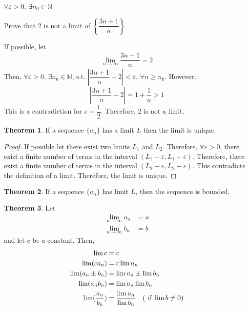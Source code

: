\documentclass[fleqn, a4paper, 12pt, twoside]{article}
\theoremstyle{definition}
\theoremstyle{theorem}
\newtheorem{theorem}{Theorem}
\begin{document}
{\begin{solution}
	$\forall \varepsilon > 0$, $\exists n_0 \in \mathbb{N}$
\end{solution}

\begin{question}
	Prove that 2 is not a limit of $\left\{ \dfrac{3n + 1}{n} \right\}$.
\end{question}

\begin{solution}
	If possible, let 
	\begin{align*}
		\lim\limits_{n \to \infty} \dfrac{3n + 1}{n} = 2
	\end{align*}
	Then, $\forall \varepsilon > 0$, $\exists n_0 \in \mathbb{N}$, s.t. $\left| \dfrac{3n + 1}{n} - 2 \right| < \varepsilon$, $\forall n \geq n_0$.
	However,
	\begin{equation*}
		\left| \dfrac{3n + 1}{n} - 2 \right| = 1 + \dfrac{1}{n} > 1
	\end{equation*}
	This is a contradiction for $\varepsilon = \dfrac{1}{2}$.
	Therefore, 2 is not a limit.
\end{solution}

\begin{theorem}
	If a sequence $\{a_n\}$ has a limit $L$ then the limit is unique.
	\label{uniquness of a limit}
\end{theorem}

\begin{proof}
	If possible let there exist two limits $L_1$ and $L_2$.
	Therefore, $\forall \varepsilon > 0$, there exist a finite number of terms in the interval $(L_1 - \varepsilon, L_1 + \varepsilon)$.
	Therefore, there exist a finite number of terms in the interval $(L_2 - \varepsilon, L_2 + \varepsilon)$.
	This contradicts the definition of a limit.
	Therefore, the limit is unique.
\end{proof}

\begin{theorem}
	If a sequence $\{a_n\}$ has limit $L$, then the sequence is bounded.
	\label{existence of limit implies boundedness}
\end{theorem}

\begin{theorem}
	Let
	\begin{align*}
		\lim\limits_{n \to \infty} a_n &= a\\
		\lim\limits_{n \to \infty} b_n &= b
	\end{align*}
	and let $c$ be a constant.
	Then,
	\begin{align*}
		\lim c &= c\\
		\lim (c a_n) &= c \lim a_n\\
		\lim (a_n \pm b_n) &= \lim a_n \pm \lim b_n\\
		\lim (a_n b_n) &= \lim a_n \lim b_n\\
		\lim (\dfrac{a_n}{b_n}) &= \dfrac{\lim a_n}{\lim b_n} \quad (\textnormal{ if } \lim b \neq 0)
	\end{align*}
	\label{limit arithmetic}
\end{theorem}

}
\end{document}
